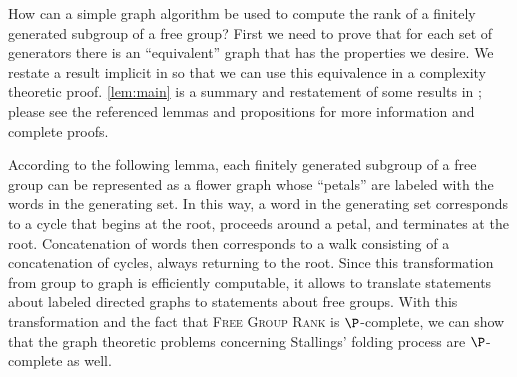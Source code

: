 \documentclass{article}
\newcommand{\FGR}{\textsc{Free Group Rank}}
\begin{document}
How can a simple graph algorithm be used to compute the rank of a finitely generated subgroup of a free group?
First we need to prove that for each set of generators there is an ``equivalent'' graph that has the properties we desire.
We restate a result implicit in \autocite{km02} so that we can use this equivalence in a complexity theoretic proof.
\autoref{lem:main} is a summary and restatement of some results in \autocite{km02}; please see the referenced lemmas and propositions for more information and complete proofs.

%
According to the following lemma, each finitely generated subgroup of a free group can be represented as a flower graph whose ``petals'' are labeled with the words in the generating set.
In this way, a word in the generating set corresponds to a cycle that begins at the root, proceeds around a petal, and terminates at the root.
Concatenation of words then corresponds to a walk consisting of a concatenation of cycles, always returning to the root.
Since this transformation from group to graph is efficiently computable, it allows to translate statements about labeled directed graphs to statements about free groups.
With this transformation and the fact that \FGR{} is $\P$-complete, we can show that the graph theoretic problems concerning Stallings' folding process are $\P$-complete as well.
\end{document}
